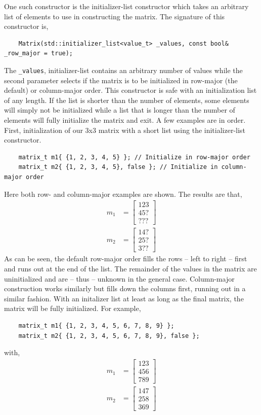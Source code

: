 \documentclass[10pt,letterpaper]{memoir} %
\begin{document}
One such constructor is the initializer-list constructor which takes an arbitrary list of elements to use in constructing the matrix.  The signature of this constructor is,
\begin{verbatim}
	Matrix(std::initializer_list<value_t> _values, const bool& _row_major = true);	
\end{verbatim}
The \texttt{_values}, initializer-list contains an arbitrary number of values while the second parameter selects if the matrix is to be initialized in row-major (the default) or column-major order.  This constructor is safe with an initialization list of any length.  If the list is shorter than the number of elements, some elements will simply not be initialized while a list that is longer than the number of elements will fully initialize the matrix and exit.  A few examples are in order.  First, initialization of our 3x3 matrix with a short list using the initializer-list constructor.
\begin{verbatim}
	matrix_t m1{ {1, 2, 3, 4, 5} }; // Initialize in row-major order
	matrix_t m2{ {1, 2, 3, 4, 5}, false }; // Initialize in column-major order
\end{verbatim}
Here both row- and column-major examples are shown.  The results are that,
\begin{align}
	m_1 &= \begin{bmatrix} 1 2 3 \\ 4 5 ? \\ ? ? ? \end{bmatrix} \\  
	m_2 &= \begin{bmatrix} 1 4 ? \\ 2 5 ? \\ 3 ? ? \end{bmatrix} 
\end{align} 
As can be seen, the default row-major order fills the rows -- left to right -- first and runs out at the end of the list.  The remainder of the values in the matrix are uninitialized and are -- thus -- unknown in the general case.  Column-major construction works similarly but fills down the columns first, running out in a similar fashion.  With an initalizer list at least as long as the final matrix, the matrix will be fully initialized.  For example,
\begin{verbatim}
	matrix_t m1{ {1, 2, 3, 4, 5, 6, 7, 8, 9} };
	matrix_t m2{ {1, 2, 3, 4, 5, 6, 7, 8, 9}, false };
\end{verbatim}
with,
\begin{align}
	m_1 &= \begin{bmatrix} 1 2 3 \\ 4 5 6 \\ 7 8 9 \end{bmatrix} \\  
	m_2 &= \begin{bmatrix} 1 4 7 \\ 2 5 8 \\ 3 6 9 \end{bmatrix} 
\end{align} 
\end{document}
